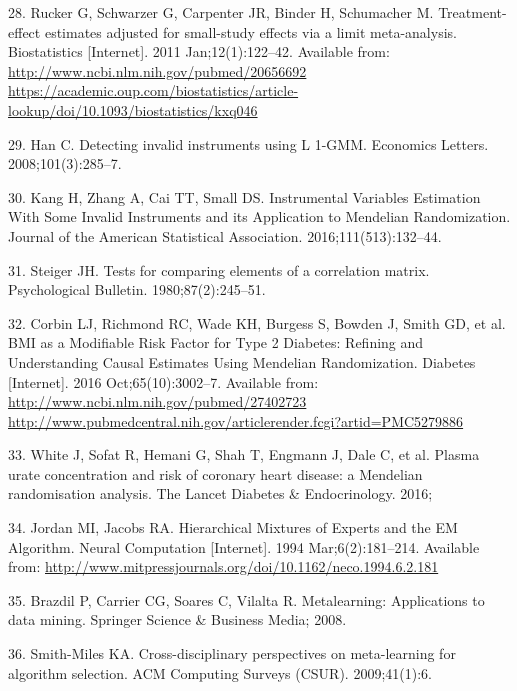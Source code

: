 \documentclass[]{article}
\begin{document}
\hypertarget{ref-Rucker2011}{}
28. Rucker G, Schwarzer G, Carpenter JR, Binder H, Schumacher M.
Treatment-effect estimates adjusted for small-study effects via a limit
meta-analysis. Biostatistics {[}Internet{]}. 2011 Jan;12(1):122--42.
Available from:
\href{http://www.ncbi.nlm.nih.gov/pubmed/20656692\%20https://academic.oup.com/biostatistics/article-lookup/doi/10.1093/biostatistics/kxq046}{http://www.ncbi.nlm.nih.gov/pubmed/20656692 https://academic.oup.com/biostatistics/article-lookup/doi/10.1093/biostatistics/kxq046}

\hypertarget{ref-Han2008}{}
29. Han C. Detecting invalid instruments using L 1-GMM. Economics
Letters. 2008;101(3):285--7.

\hypertarget{ref-Kang2016}{}
30. Kang H, Zhang A, Cai TT, Small DS. Instrumental Variables Estimation
With Some Invalid Instruments and its Application to Mendelian
Randomization. Journal of the American Statistical Association.
2016;111(513):132--44.

\hypertarget{ref-Steiger1980}{}
31. Steiger JH. Tests for comparing elements of a correlation matrix.
Psychological Bulletin. 1980;87(2):245--51.

\hypertarget{ref-Corbin2016}{}
32. Corbin LJ, Richmond RC, Wade KH, Burgess S, Bowden J, Smith GD, et
al. BMI as a Modifiable Risk Factor for Type 2 Diabetes: Refining and
Understanding Causal Estimates Using Mendelian Randomization. Diabetes
{[}Internet{]}. 2016 Oct;65(10):3002--7. Available from:
\href{http://www.ncbi.nlm.nih.gov/pubmed/27402723\%20http://www.pubmedcentral.nih.gov/articlerender.fcgi?artid=PMC5279886}{http://www.ncbi.nlm.nih.gov/pubmed/27402723 http://www.pubmedcentral.nih.gov/articlerender.fcgi?artid=PMC5279886}

\hypertarget{ref-white2016plasma}{}
33. White J, Sofat R, Hemani G, Shah T, Engmann J, Dale C, et al. Plasma
urate concentration and risk of coronary heart disease: a Mendelian
randomisation analysis. The Lancet Diabetes \& Endocrinology. 2016;

\hypertarget{ref-Jordan1994}{}
34. Jordan MI, Jacobs RA. Hierarchical Mixtures of Experts and the EM
Algorithm. Neural Computation {[}Internet{]}. 1994 Mar;6(2):181--214.
Available from:
\url{http://www.mitpressjournals.org/doi/10.1162/neco.1994.6.2.181}

\hypertarget{ref-brazdil2008metalearning}{}
35. Brazdil P, Carrier CG, Soares C, Vilalta R. Metalearning:
Applications to data mining. Springer Science \& Business Media; 2008.

\hypertarget{ref-smith2009cross}{}
36. Smith-Miles KA. Cross-disciplinary perspectives on meta-learning for
algorithm selection. ACM Computing Surveys (CSUR). 2009;41(1):6.
\end{document}
